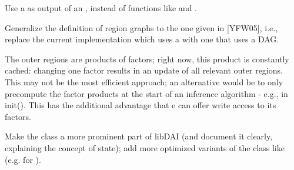 \begin{DoxyRefList}
Use a  as output of an , instead of functions like  and .  
\item[Class \doxylink{classdai_1_1RegionGraph}{dai\+::Region\+Graph} ]\label{ideas__ideas000007}%
%
 Generalize the definition of region graphs to the one given in \mbox{[}YFW05\mbox{]}, i.\+e., replace the current implementation which uses a  with one that uses a DAG. 



The outer regions are products of factors; right now, this product is constantly cached\+: changing one factor results in an update of all relevant outer regions. This may not be the most efficient approach; an alternative would be to only precompute the factor products at the start of an inference algorithm -\/ e.\+g., in init(). This has the additional advantage that  e can offer write access to its factors.  
\item[Class \doxylink{classdai_1_1State}{dai\+::State} ]\label{ideas__ideas000006}%
%
 Make the  class a more prominent part of lib\+DAI (and document it clearly, explaining the concept of state); add more optimized variants of the  class like  (e.\+g. for ). 
\end{DoxyRefList}
